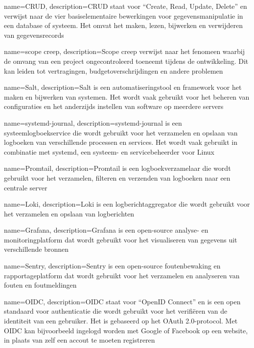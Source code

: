 {
    name=CRUD,
    description={CRUD staat voor ``Create, Read, Update, Delete'' en verwijst naar de vier basiselementaire bewerkingen voor gegevensmanipulatie in een database of systeem. Het omvat het maken, lezen, bijwerken en verwijderen van gegevensrecords}
}

{
    name=scope creep,
    description={Scope creep verwijst naar het fenomeen waarbij de omvang van een project ongecontroleerd toeneemt tijdens de ontwikkeling. Dit kan leiden tot vertragingen, budgetoverschrijdingen en andere problemen}
}

{
    name=Salt,
    description={Salt is een automatiseringstool en framework voor het maken en bijwerken van systemen. Het wordt vaak gebruikt voor het beheren van configuraties en het anderzijds instellen van software op meerdere servers}
}

{
    name=systemd-journal,
    description={systemd-journal is een systeemlogboekservice die wordt gebruikt voor het verzamelen en opslaan van logboeken van verschillende processen en services. Het wordt vaak gebruikt in combinatie met systemd, een systeem- en servicebeheerder voor Linux}
}

{
    name=Promtail,
    description={Promtail is een logboekverzamelaar die wordt gebruikt voor het verzamelen, filteren en verzenden van logboeken naar een centrale server}
}

{
    name=Loki,
    description={Loki is een logberichtaggregator die wordt gebruikt voor het verzamelen en opslaan van logberichten}
}

{
    name=Grafana,
    description={Grafana is een open-source analyse- en monitoringplatform dat wordt gebruikt voor het visualiseren van gegevens uit verschillende bronnen}
}

{
    name=Sentry,
    description={Sentry is een open-source foutenbewaking en rapportageplatform dat wordt gebruikt voor het verzamelen en analyseren van fouten en foutmeldingen}
}

{
    name=OIDC,
    description={OIDC staat voor ``OpenID Connect'' en is een open standaard voor authenticatie die wordt gebruikt voor het verifiëren van de identiteit van een gebruiker. Het is gebaseerd op het OAuth 2.0-protocol. Met OIDC kan bijvoorbeeld ingelogd worden met Google of Facebook op een website, in plaats van zelf een accout te moeten registreren}
}
